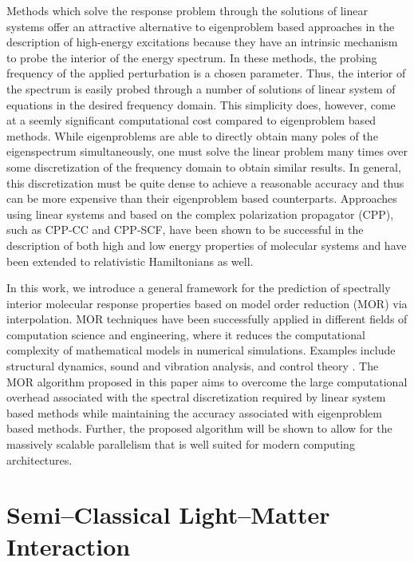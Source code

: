 Methods which solve the response problem through the solutions of linear systems offer an attractive alternative to eigenproblem based approaches in the description of high-energy excitations because they have an intrinsic
mechanism to probe the interior of the energy spectrum. In these methods, the
probing frequency of the applied perturbation is a chosen parameter.\cite{Hattig98_1,Ruud12_543} Thus,
the interior of the spectrum is easily probed through a number of solutions
of linear system of equations in the desired frequency domain. This simplicity 
does, however, come at a seemly significant computational cost compared to eigenproblem based methods.
While eigenproblems are able to directly obtain many poles of the eigenspectrum
simultaneously, one must solve the linear problem many times
over some discretization of the frequency domain to obtain similar results.
In general, this discretization must be quite dense to achieve a reasonable 
accuracy and thus can be more expensive than their eigenproblem based counterparts. Approaches using linear systems and based on the complex
polarization propagator (CPP), such as CPP-CC\cite{Norman12_1616,Norman13_124311,Coriani13_211102} and CPP-SCF,\cite{Rubio_Book,Ruud12_543,Yeager84_33,Oddershede01_JCP}
have been shown to be successful in the description of both high\cite{Norman16_1991,Norman12_022507,Norman10_5096,Agren06_143001,Norman16_13591} and low\cite{Mathieu15_21866} energy properties of molecular systems and have been extended to relativistic Hamiltonians as well\cite{Norman10_064105}.

In this work, we introduce a general framework for the prediction of spectrally interior molecular response properties based on model order reduction (MOR) via interpolation. MOR techniques have been successfully applied in different fields of computation science and engineering, where it reduces the computational complexity of mathematical models in numerical simulations. Examples include structural dynamics, sound and vibration analysis, and control theory \cite{Antoulas2005}. The MOR algorithm proposed in this paper aims to overcome the large computational overhead associated with the spectral discretization required by linear system based methods while maintaining the accuracy associated with eigenproblem based methods. Further, the proposed algorithm will be shown to allow for the massively scalable parallelism that is well suited for modern computing architectures.


\section{Semi--Classical Light--Matter Interaction}
\label{sec:SCLMI}

